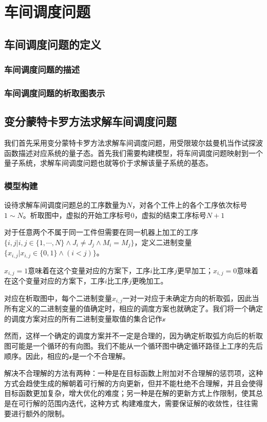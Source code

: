 \chapter{车间调度问题}\label{chap:JSP}
\section{车间调度问题的定义}
\subsection{车间调度问题的描述}
\subsection{车间调度问题的析取图表示}

\section{变分蒙特卡罗方法求解车间调度问题}
我们首先采用变分蒙特卡罗方法求解车间调度问题，用受限玻尔兹曼机当作试探波函数描述对应系统的量子态。首先我们需要构建模型，将车间调度问题映射到一个量子系统，求解车间调度问题也就等价于求解该量子系统的基态。
\subsection{模型构建}
设待求解车间调度问题总的工序数量为$N$，对各个工件上的各个工序依次标号$1\sim N$。析取图中，虚拟的开始工序标号$0$，虚拟的结束工序标号$N+1$

对于任意两个不属于同一工件但需要在同一机器上加工的工序$\{i,j|i,j\in \{1,\cdots,N\}\wedge J_i \neq J_j\wedge M_i=M_j\}$，定义二进制变量$\{x_{i,j}|x_{i,j} \in \{0,1\}\wedge (i<j)\}$。

$x_{i,j}=1$意味着在这个变量对应的方案下，工序$i$比工序$j$更早加工；$x_{i,j}=0$意味着在这个变量对应的方案下，工序$i$比工序$j$更晚加工。

对应在析取图中，每个二进制变量$x_{i,j}$一对一对应于未确定方向的析取弧，因此当所有定义的二进制变量的值确定时，相应的调度方案也就确定了。我们将一个确定的调度方案对应的所有二进制变量取值的集合记作$\mathcal{x}$

然而，这样一个确定的调度方案并不一定是合理的，因为确定析取弧方向后的析取图可能是一个循环的有向图。我们不能从一个循环图中确定循环路径上工序的先后顺序。因此，相应的$\mathcal{x}$是一个不合理解。

解决不合理解的方法有两种：一种是在目标函数上附加对不合理解的惩罚项，这种方式会趋使生成的解朝着可行解的方向更新，但并不能杜绝不合理解，并且会使得目标函数更加复杂，增大优化的难度；另一种是在解的更新方式上作限制，使其总是在可行解的范围内迭代，这种方式
构建难度大，需要保证解的收敛性，往往需要进行额外的限制。